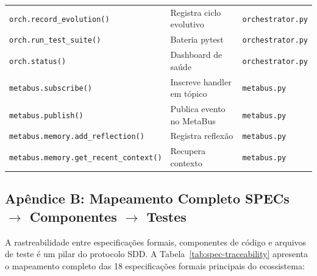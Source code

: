 \begin{table}[H]
\begin{tabular}{@{}lp{6cm}p{5cm}@{}}
\texttt{orch.record\_evolution()} & Registra ciclo evolutivo & \texttt{orchestrator.py} \\
\texttt{orch.run\_test\_suite()} & Bateria pytest & \texttt{orchestrator.py} \\
\texttt{orch.status()} & Dashboard de saúde & \texttt{orchestrator.py} \\
\texttt{metabus.subscribe()} & Inscreve handler em tópico & \texttt{metabus.py} \\
\texttt{metabus.publish()} & Publica evento no MetaBus & \texttt{metabus.py} \\
\texttt{metabus.memory.add\_reflection()} & Registra reflexão & \texttt{metabus.py} \\
\texttt{metabus.memory.get\_recent\_context()} & Recupera contexto & \texttt{metabus.py} \\
\bottomrule
\end{tabular}
\end{table}

\subsection{Apêndice B: Mapeamento Completo SPECs $\to$ Componentes $\to$ Testes}
\label{sec:apendice-specs}

A rastreabilidade entre especificações formais, componentes de código e arquivos de teste é um pilar do protocolo SDD. A Tabela~\ref{tab:spec-traceability} apresenta o mapeamento completo das 18 especificações formais principais do ecossistema:

